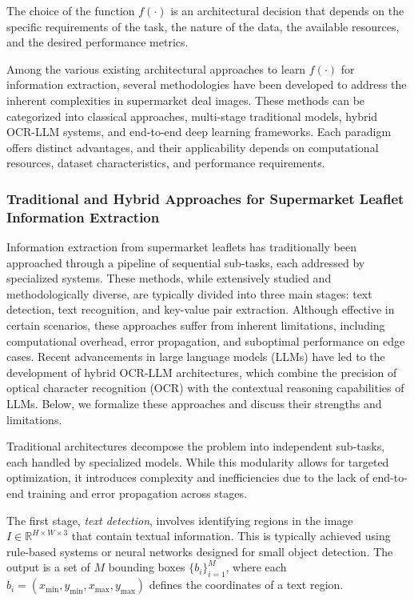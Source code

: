 \documentclass[11pt]{article}
\begin{document}
The choice of the function $ f(\cdot) $ is an architectural decision that depends on the specific requirements of the task, the nature of the data, the available resources, and the desired performance metrics. 

Among the various existing architectural approaches to learn $ f(\cdot) $ for information extraction, several methodologies have been developed to address the inherent complexities in supermarket deal images. These methods can be categorized into classical approaches, multi-stage traditional models, hybrid OCR-LLM systems, and end-to-end deep learning frameworks. Each paradigm offers distinct advantages, and their applicability depends on computational resources, dataset characteristics, and performance requirements.

\subsubsection{Traditional and Hybrid Approaches for Supermarket Leaflet Information Extraction}  
Information extraction from supermarket leaflets has traditionally been approached through a pipeline of sequential sub-tasks, each addressed by specialized systems. These methods, while extensively studied and methodologically diverse, are typically divided into three main stages: text detection, text recognition, and key-value pair extraction. Although effective in certain scenarios, these approaches suffer from inherent limitations, including computational overhead, error propagation, and suboptimal performance on edge cases. Recent advancements in large language models (LLMs) have led to the development of hybrid OCR-LLM architectures, which combine the precision of optical character recognition (OCR) with the contextual reasoning capabilities of LLMs. Below, we formalize these approaches and discuss their strengths and limitations.

Traditional architectures decompose the problem into independent sub-tasks, each handled by specialized models. While this modularity allows for targeted optimization, it introduces complexity and inefficiencies due to the lack of end-to-end training and error propagation across stages.

The first stage, \emph{text detection}, involves identifying regions in the image $ I \in \mathbb{R}^{H \times W \times 3} $ that contain textual information. This is typically achieved using rule-based systems or neural networks designed for small object detection. The output is a set of $ M $ bounding boxes $ \{b_i\}_{i=1}^{M} $, where each $ b_i = (x_{\text{min}}, y_{\text{min}}, x_{\text{max}}, y_{\text{max}}) $ defines the coordinates of a text region. 
\end{document}
